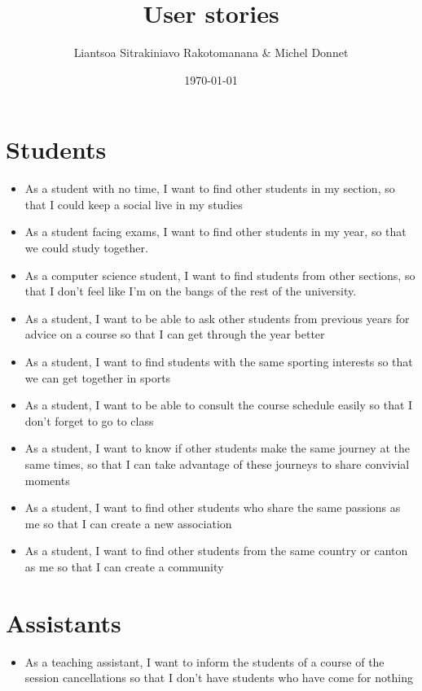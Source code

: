 \documentclass[11pt]{article}
\author{Liantsoa Sitrakiniavo Rakotomanana \& Michel Donnet}
\date{\today}
\title{User stories}
\begin{document}
\maketitle

\section{Students}
\label{sec:org7e1d817}
\begin{itemize}
\item As a student with no time, I want to find other students in my section, so that I could keep a social live in my studies
\item As a student facing exams, I want to find other students in my year, so that we could study together.
\item As a computer science student, I want to find students from other sections, so that I don't feel like I'm on the bangs of the rest of the university.
\item As a student, I want to be able to ask other students from previous years for advice on a course so that I can get through the year better
\item As a student, I want to find students with the same sporting interests so that we can get together in sports
\item As a student, I want to be able to consult the course schedule easily so that I don't forget to go to class
\item As a student, I want to know if other students make the same journey at the same times, so that I can take advantage of these journeys to share convivial moments
\item As a student, I want to find other students who share the same passions as me so that I can create a new association
\item As a student, I want to find other students from the same country or canton as me so that I can create a community
\end{itemize}

\section{Assistants}
\label{sec:orgcb6096b}
\begin{itemize}
\item As a teaching assistant, I want to inform the students of a course of the session cancellations so that I don't have students who have come for nothing
\end{itemize}
\end{document}
